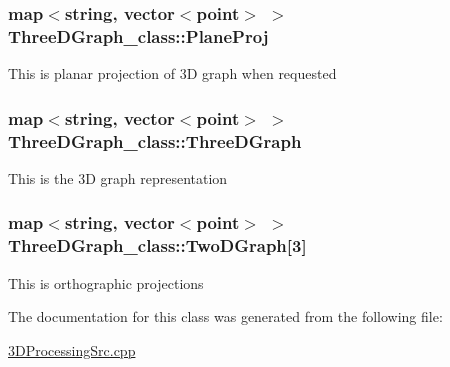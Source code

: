 \subsubsection[{\texorpdfstring{Plane\+Proj}{PlaneProj}}]{\setlength{\rightskip}{0pt plus 5cm}map$<$string, vector$<${\bf point}$>$ $>$ Three\+D\+Graph\+\_\+class\+::\+Plane\+Proj}\hypertarget{classThreeDGraph__class_ad800b572d58a46cbd5b4139b3ec7b173}{}\label{classThreeDGraph__class_ad800b572d58a46cbd5b4139b3ec7b173}
This is planar projection of 3D graph when requested 
\subsubsection[{\texorpdfstring{Three\+D\+Graph}{ThreeDGraph}}]{\setlength{\rightskip}{0pt plus 5cm}map$<$string, vector$<${\bf point}$>$ $>$ Three\+D\+Graph\+\_\+class\+::\+Three\+D\+Graph}\hypertarget{classThreeDGraph__class_a10f2244053d72def3eed9fb4101f0236}{}\label{classThreeDGraph__class_a10f2244053d72def3eed9fb4101f0236}
This is the 3D graph representation 
\subsubsection[{\texorpdfstring{Two\+D\+Graph}{TwoDGraph}}]{\setlength{\rightskip}{0pt plus 5cm}map$<$string, vector$<${\bf point}$>$ $>$ Three\+D\+Graph\+\_\+class\+::\+Two\+D\+Graph\mbox{[}3\mbox{]}}\hypertarget{classThreeDGraph__class_a352d2c3b25256d8a071132dd87606f99}{}\label{classThreeDGraph__class_a352d2c3b25256d8a071132dd87606f99}
This is orthographic projections 

The documentation for this class was generated from the following file\+:\begin{DoxyCompactItemize}
\item 
\hyperlink{3DProcessingSrc_8cpp}{3\+D\+Processing\+Src.\+cpp}\end{DoxyCompactItemize}
